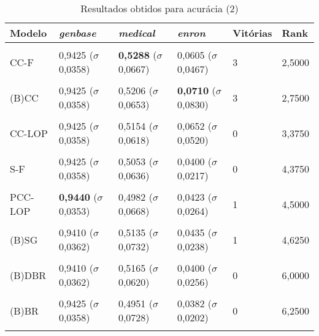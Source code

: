 \begin{table}[htbp]
	\centering
	\caption{Resultados obtidos para acurácia (2)}
		\begin{tabular}
        { p{0.88in} p{0.88in} p{0.88in} p{0.88in} p{0.88in} p{0.88in} }
        
        \hline
Modelo & \textit{genbase} & \textit{medical} & \textit{enron} & \textbf{Vitórias} & \textbf{Rank} \\ 
\hline \\

CC-F & 0,9425 \newline ($\sigma$ 0,0358) & \textbf{0,5288} \newline ($\sigma$ 0,0667) & 0,0605 \newline ($\sigma$ 0,0467) & 3 & 2,5000 \\ \\
(B)CC & 0,9425 \newline ($\sigma$ 0,0358) & 0,5206 \newline ($\sigma$ 0,0653) & \textbf{0,0710} \newline ($\sigma$ 0,0830) & 3 & 2,7500 \\ \\
CC-LOP & 0,9425 \newline ($\sigma$ 0,0358) & 0,5154 \newline ($\sigma$ 0,0618) & 0,0652 \newline ($\sigma$ 0,0520) & 0 & 3,3750 \\ \\
S-F & 0,9425 \newline ($\sigma$ 0,0358) & 0,5053 \newline ($\sigma$ 0,0636) & 0,0400 \newline ($\sigma$ 0,0217) & 0 & 4,3750 \\ \\
PCC-LOP & \textbf{0,9440} \newline ($\sigma$ 0,0353) & 0,4982 \newline ($\sigma$ 0,0668) & 0,0423 \newline ($\sigma$ 0,0264) & 1 & 4,5000 \\ \\
(B)SG & 0,9410 \newline ($\sigma$ 0,0362) & 0,5135 \newline ($\sigma$ 0,0732) & 0,0435 \newline ($\sigma$ 0,0238) & 1 & 4,6250 \\ \\
(B)DBR & 0,9410 \newline ($\sigma$ 0,0362) & 0,5165 \newline ($\sigma$ 0,0620) & 0,0400 \newline ($\sigma$ 0,0256) & 0 & 6,0000 \\ \\
(B)BR & 0,9425 \newline ($\sigma$ 0,0358) & 0,4951 \newline ($\sigma$ 0,0728) & 0,0382 \newline ($\sigma$ 0,0202) & 0 & 6,2500 \\ \\


\end{tabular}
\end{table}
